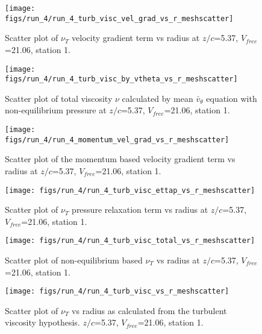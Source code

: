 \begin{figure}[H]
\centering
\texttt{[image: figs/run\_4/run\_4\_turb\_visc\_vel\_grad\_vs\_r\_meshscatter]}
\caption{Scatter plot of $\nu_T$ velocity gradient term vs radius at $z/c$=5.37, $V_{free}$=21.06, station 1.}
\end{figure}


\begin{figure}[H]
\centering
\texttt{[image: figs/run\_4/run\_4\_turb\_visc\_by\_vtheta\_vs\_r\_meshscatter]}
\caption{Scatter plot of total viscosity $\nu$ calculated by mean $\bar{v}_{\theta}$ equation with non-equilibrium pressure at $z/c$=5.37, $V_{free}$=21.06, station 1.}
\end{figure}


\begin{figure}[H]
\centering
\texttt{[image: figs/run\_4/run\_4\_momentum\_vel\_grad\_vs\_r\_meshscatter]}
\caption{Scatter plot of the momentum based velocity gradient term vs radius at $z/c$=5.37, $V_{free}$=21.06, station 1.}
\end{figure}


\begin{figure}[H]
\centering
\texttt{[image: figs/run\_4/run\_4\_turb\_visc\_ettap\_vs\_r\_meshscatter]}
\caption{Scatter plot of $\nu_T$ pressure relaxation term vs radius at $z/c$=5.37, $V_{free}$=21.06, station 1.}
\end{figure}


\begin{figure}[H]
\centering
\texttt{[image: figs/run\_4/run\_4\_turb\_visc\_total\_vs\_r\_meshscatter]}
\caption{Scatter plot of non-equilibrium based $\nu_T$ vs radius at $z/c$=5.37, $V_{free}$=21.06, station 1.}
\end{figure}


\begin{figure}[H]
\centering
\texttt{[image: figs/run\_4/run\_4\_turb\_visc\_vs\_r\_meshscatter]}
\caption{Scatter plot of $\nu_T$ vs radius as calculated from the turbulent viscosity hypothesis. $z/c$=5.37, $V_{free}$=21.06, station 1.}
\end{figure}


